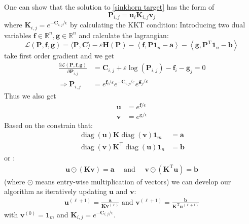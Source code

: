 \documentclass{article}
\begin{document}
\begin{large}
One can show that the solution to \ref{sinkhorn target} has the form of 
\begin{equation}
\mathbf { P } _ { i , j } = \mathbf { u } _ { i } \mathbf { K } _ { i , j } \mathbf { v } _ { j }
\end{equation}
where $\mathbf { K } _ { i , j } = e^{-\mathbf{C}_{i,j}/\epsilon}$ by calculating the KKT condition:
Introducing two dual variables $\mathbf { f } \in \mathbb { R } ^ { n } , \mathbf { g } \in \mathbb { R } ^ { n }$ and calculate the lagrangian:
\begin{equation}
\mathcal { L } ( \mathbf { P } , \mathbf { f } , \mathbf { g } ) = \langle \mathbf { P } , \mathbf { C } \rangle - \varepsilon \mathbf { H } ( \mathbf { P } ) - \left\langle \mathbf { f } , \mathbf { P } \mathbf { 1 } _ { n } - \mathbf { a } \right\rangle - \left\langle \mathbf { g } , \mathbf { P } ^ { \mathrm { T } } \mathbf{ 1 } _ { n } - \mathbf { b } \right\rangle
\end{equation}
take first order gradient and we get
\begin{align}
\frac { \partial \mathcal { L } ( \mathbf { P } , \mathbf { f } , \mathbf { g } ) } { \partial \mathbf { P } _ { i , j } } &= \mathbf { C } _ { i , j } + \varepsilon \log \left( \mathbf { P } _ { i , j } \right) - \mathbf { f } _ { i } - \mathbf { g } _ { j } = 0\\
\Rightarrow\mathbf { P } _ { i , j } &= e ^ { \mathbf { f } _ { i } / \varepsilon } e ^ { - \mathbf { C } _ { i , j } / \varepsilon } e ^ { \mathbf { g } _ { j } / \varepsilon }
\label{solution for P}
\end{align}
Thus we also get
\begin{align}
\mathbf{u} &= e^{\mathbf{f}/\epsilon}\\
\mathbf{v} &= e^{\mathbf{g}/\epsilon}
\end{align}
Based on the constrain that:
\begin{align}
\operatorname { diag } ( \mathbf { u } ) \mathbf { K } \operatorname { diag } ( \mathbf { v } ) \mathbf { 1 } _ { m } &= \mathbf { a }\\
\operatorname { diag } ( \mathbf { v } ) \mathbf { K } ^ { \top } \operatorname { diag } ( \mathbf { u } ) \mathbf { 1 } _ { n } &= \mathbf { b }
\end{align}
or :
\begin{align}
\mathbf { u } \odot ( \mathbf { K } \mathbf { v } ) = \mathbf { a } \quad \text { and } \quad \mathbf { v } \odot \left( \mathbf { K } ^ { \mathrm { T } } \mathbf { u } \right) = \mathbf { b }
\label{solution for marginal}
\end{align}
(where $\odot$ means entry-wise multiplication of vectors) we can develop our algorithm as iteratively updating $\mathbf { u }$ and $\mathbf { v }$:
\begin{align}
\mathbf { u } ^ { ( \ell + 1 ) }  { = } \frac { \mathbf { a } } { \mathbf { K } \mathbf { v } ^ { ( \ell ) } } \text { and } \mathbf { v } ^ { ( \ell + 1 ) } { = } \frac { \mathbf { b } } { \mathbf { K } ^ { \mathrm { T } } \mathbf { u } ^ { ( \ell + 1 ) } }
\end{align}
with $\mathbf { v } ^ { ( 0 ) } = \mathbf { 1 } _ { m }$ and $\mathbf { K } _ { i ,j } = e^{-\mathbf{C}_{i,j}/\epsilon}$.


\end{large}
\end{document}
